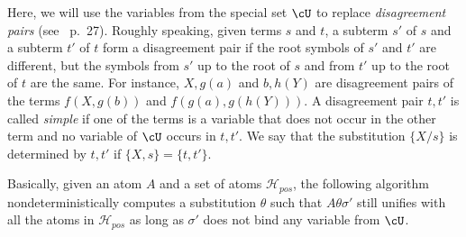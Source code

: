\documentclass[fleqn]{tlp}
\newcommand{\Hpos}{\mathcal{H}_{\mathit{pos}}}
\begin{document}
Here, we will use the variables from the special set $\cU$ to
replace \emph{disagreement pairs}
(see~\cite{Apt97} p.~27).
Roughly speaking, given terms $s$ and $t$, a subterm $s'$ of $s$ and a
subterm $t'$ of $t$ form a disagreement pair if the root symbols of
$s'$ and $t'$ are different, but the symbols from $s'$ up to the root of
$s$ and from $t'$ up to the root of $t$ are the same. For instance,
$X,g(a)$ and $b,h(Y)$ are disagreement pairs of the terms $f(X,g(b))$
and $f(g(a),g(h(Y)))$.
A disagreement pair $t,t'$ is called \emph{simple}
if one of the terms is a variable that does not occur in the other
term and no variable of $\cU$ occurs in $t,t'$.  We say that
the substitution $\{X/s\}$ is determined by $t,t'$ if
$\{X,s\}=\{t,t'\}$.

Basically, given an atom $A$ and a set of atoms $\Hpos$, the following
algorithm nondeterministically computes a substitution $\theta$ such
that $A\theta\sigma'$ still unifies with all the atoms in $\Hpos$ as
long as $\sigma'$ does not bind any variable from $\cU$.
\end{document}
